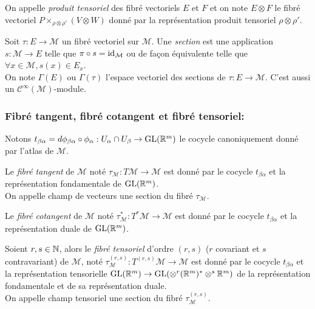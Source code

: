 \documentclass[12pt, a4paper]{book}
\begin{document}
\begin{defi}
On appelle \emph{produit tensoriel} des fibré vectoriels $E$ et $F$ et on note $E\otimes F$ le fibré vectoriel $P \times_{\rho \otimes \rho'} (V\otimes W)$ donné par la représentation produit tensoriel $\rho \otimes \rho'$.
\end{defi}

\begin{defi}[Section]
Soit $\tau: E \to \mathcal{M}$ un fibré vectoriel sur $\mathcal{M}$. Une \emph{section} est une application $s:\mathcal{M} \to E$ telle que $\pi \circ s = \operatorname{id}_\mathcal{M}$ ou de façon équivalente telle que $\forall x\in \mathcal{M}, s(x) \in E_x$. \\
On note $\Gamma(E)$ ou $\Gamma(\tau)$ l'espace vectoriel des sections de $\tau: E \to \mathcal{M}$. C'est aussi un $\mathscr{C}^\infty(\mathcal{M})$-module.
\end{defi}

\subsubsection{Fibré tangent, fibré cotangent et fibré tensoriel:}

Notons $t_{\beta\alpha} = d\phi_{\beta\alpha} \circ \phi_\alpha : U_\alpha \cap U_\beta \to \operatorname{GL}(\mathbb{R}^m)$ le cocycle canoniquement donné par l'atlas de $\mathcal{M}$.

\begin{defi}
Le \emph{fibré tangent} de $\mathcal{M}$ noté $\tau_\mathcal{M} : T\mathcal{M} \to \mathcal{M}$ est donné par le cocycle $t_{\beta\alpha}$ et la représentation fondamentale de $\operatorname{GL}(\mathbb{R}^m)$. \\
On appelle champ de vecteurs une section du fibré $\tau_\mathcal{M}$.
\end{defi}

\begin{defi}
Le \emph{fibré cotangent} de $\mathcal{M}$ noté $\tau^*_\mathcal{M} : T^*\mathcal{M} \to \mathcal{M}$ est donné par le cocycle $t_{\beta\alpha}$ et la représentation duale de $\operatorname{GL}(\mathbb{R}^m)$. 
\end{defi}

\begin{defi}
Soient $r,s\in \mathbb{N}$, alors le \emph{fibré tensoriel} d'ordre $(r,s)$ ($r$ covariant et $s$ contravariant) de $\mathcal{M}$, noté $\tau^{(r,s)}_\mathcal{M} : T^{(r,s)}\mathcal{M} \to \mathcal{M}$ est donné par le cocycle $t_{\beta\alpha}$ et la représentation tensorielle $\operatorname{GL}(\mathbb{R}^m) \to \operatorname{GL}(\otimes^r(\mathbb{R}^m)^* \otimes^s\mathbb{R}^m)$ de la représentation fondamentale et de sa représentation duale. \\
On appelle champ tensoriel une section du fibré $\tau^{(r,s)}_\mathcal{M}$.
\end{defi}
\end{document}
